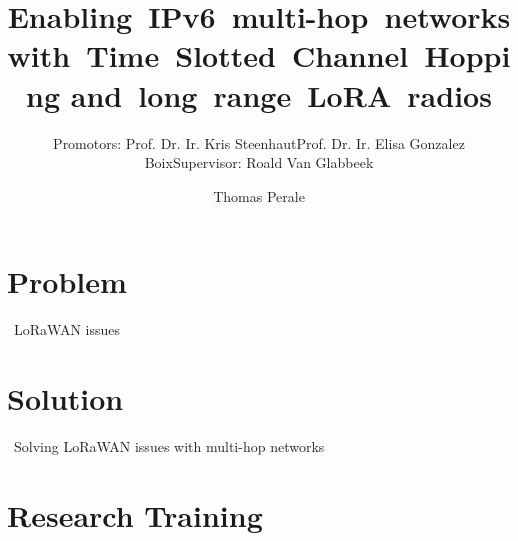 \documentclass{beamer}
\title{Enabling~IPv6~multi-hop~networks with~Time~Slotted~Channel~Hopping and~long~range~LoRA~radios} %
\subtitle{Promotors: Prof. Dr. Ir. Kris Steenhaut\newline Prof. Dr. Ir. Elisa Gonzalez Boix\newline Supervisor: Roald Van Glabbeek}
\author{Thomas Perale}
\begin{document}
\frame{\maketitle} %







\section{Problem}

{
\begin{frame}[c]{}
  \centering
  \LARGE
  \vubfont
  ~LoRaWAN issues
\end{frame}
}



\section{Solution}

{
\begin{frame}[c]{}
  \centering
  \LARGE
  \vubfont
  ~Solving LoRaWAN issues with multi-hop networks
\end{frame}
}



\section{Research Training}
\end{document}
